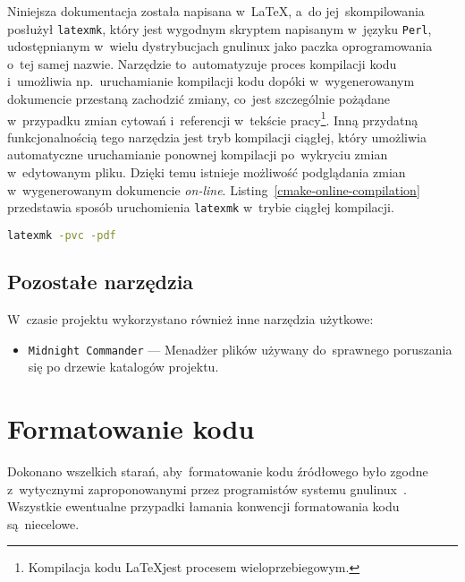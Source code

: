 \documentclass[thesis]{subfiles}
\begin{document}
Niniejsza dokumentacja została napisana w~\LaTeX, a~do jej~skompilowania posłużył \texttt{latexmk}, który jest wygodnym skryptem napisanym w~języku \texttt{Perl}, udostępnianym w~wielu dystrybucjach \gls{gnulinux} jako paczka oprogramowania o~tej samej nazwie. Narzędzie to~automatyzuje proces kompilacji kodu i~umożliwia np.~uruchamianie kompilacji kodu dopóki w~wygenerowanym dokumencie przestaną zachodzić zmiany, co~jest szczególnie pożądane w~przypadku zmian cytowań i~referencji w~tekście pracy\footnote{Kompilacja kodu \LaTeX jest procesem wieloprzebiegowym.}. Inną przydatną funkcjonalnością tego narzędzia jest tryb kompilacji ciągłej, który umożliwia automatyczne uruchamianie ponownej kompilacji po~wykryciu zmian w~edytowanym pliku. Dzięki temu istnieje możliwość podglądania zmian w~wygenerowanym dokumencie \emph{on-line}. Listing~\ref{cmake-online-compilation} przedstawia sposób uruchomienia \texttt{latexmk} w~trybie ciągłej kompilacji.

\begin{lstlisting}[label=cmake-online-compilation,language=bash,numbers=none,caption={Uruchomienie ciągłej kompilacji domyślnego pliku \LaTeX, znalezionego w~aktualnym katalogu roboczym, do~pliku wyjściowego w~formacie~PDF}]
latexmk -pvc -pdf
\end{lstlisting}


\subsection{Pozostałe narzędzia}

W~czasie projektu wykorzystano również inne narzędzia użytkowe:
\begin{itemize}
\item \texttt{Midnight~Commander} --- Menadżer plików używany do~sprawnego poruszania się po drzewie katalogów projektu.
\end{itemize}


\section{Formatowanie kodu}

Dokonano wszelkich starań, aby~formatowanie kodu źródłowego było zgodne z~wytycznymi zaproponowanymi przez programistów  systemu \gls{gnulinux}~\cite{kernel-coding-style}. Wszystkie ewentualne przypadki łamania konwencji formatowania kodu są~niecelowe.
\end{document}
